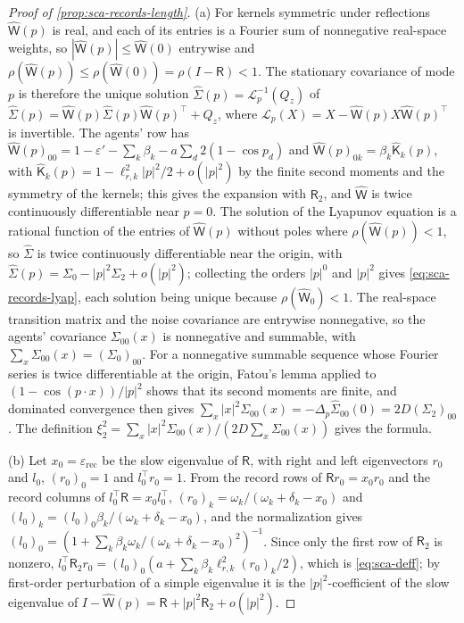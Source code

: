 \begin{proof}[Proof of \cref{prop:sca-records-length}]
(a) For kernels symmetric under reflections $\hat{\mathsf W}(p)$ is real, and each of its entries is a Fourier sum of nonnegative real-space weights, so $|\hat{\mathsf W}(p)|\le\hat{\mathsf W}(0)$ entrywise and $\rho(\hat{\mathsf W}(p))\le\rho(\hat{\mathsf W}(0))=\rho(I-\mathsf R)<1$. The stationary covariance of mode $p$ is therefore the unique solution $\hat\Sigma(p)=\mathcal L_p^{-1}(Q_z)$ of $\hat\Sigma(p)=\hat{\mathsf W}(p)\hat\Sigma(p)\hat{\mathsf W}(p)^\top+Q_z$, where $\mathcal L_p(X)=X-\hat{\mathsf W}(p)X\hat{\mathsf W}(p)^\top$ is invertible. The agents' row has $\hat{\mathsf W}(p)_{00}=1-\varepsilon'-\sum_k\beta_k-a\sum_d2(1-\cos p_d)$ and $\hat{\mathsf W}(p)_{0k}=\beta_k\hat{\mathsf K}_k(p)$, with $\hat{\mathsf K}_k(p)=1-\ell_{r,k}^2|p|^2/2+o(|p|^2)$ by the finite second moments and the symmetry of the kernels; this gives the expansion with $\mathsf R_2$, and $\hat{\mathsf W}$ is twice continuously differentiable near $p=0$. The solution of the Lyapunov equation is a rational function of the entries of $\hat{\mathsf W}(p)$ without poles where $\rho(\hat{\mathsf W}(p))<1$, so $\hat\Sigma$ is twice continuously differentiable near the origin, with $\hat\Sigma(p)=\Sigma_0-|p|^2\Sigma_2+o(|p|^2)$; collecting the orders $|p|^0$ and $|p|^2$ gives \eqref{eq:sca-records-lyap}, each solution being unique because $\rho(\hat{\mathsf W}_0)<1$. The real-space transition matrix and the noise covariance are entrywise nonnegative, so the agents' covariance $\Sigma_{00}(x)$ is nonnegative and summable, with $\sum_x\Sigma_{00}(x)=(\Sigma_0)_{00}$. For a nonnegative summable sequence whose Fourier series is twice differentiable at the origin, Fatou's lemma applied to $(1-\cos(p\cdot x))/|p|^2$ shows that its second moments are finite, and dominated convergence then gives $\sum_x|x|^2\Sigma_{00}(x)=-\Delta_p\hat\Sigma_{00}(0)=2D(\Sigma_2)_{00}$. The definition $\xi_2^2=\sum_x|x|^2\Sigma_{00}(x)/(2D\sum_x\Sigma_{00}(x))$ gives the formula.

(b) Let $x_0=\varepsilon_{\mathrm{rec}}$ be the slow eigenvalue of $\mathsf R$, with right and left eigenvectors $r_0$ and $l_0$, $(r_0)_0=1$ and $l_0^\top r_0=1$. From the record rows of $\mathsf Rr_0=x_0r_0$ and the record columns of $l_0^\top\mathsf R=x_0l_0^\top$, $(r_0)_k=\omega_k/(\omega_k+\delta_k-x_0)$ and $(l_0)_k=(l_0)_0\beta_k/(\omega_k+\delta_k-x_0)$, and the normalization gives $(l_0)_0=(1+\sum_k\beta_k\omega_k/(\omega_k+\delta_k-x_0)^2)^{-1}$. Since only the first row of $\mathsf R_2$ is nonzero, $l_0^\top\mathsf R_2r_0=(l_0)_0(a+\sum_k\beta_k\ell_{r,k}^2(r_0)_k/2)$, which is \eqref{eq:sca-deff}; by first-order perturbation of a simple eigenvalue it is the $|p|^2$-coefficient of the slow eigenvalue of $I-\hat{\mathsf W}(p)=\mathsf R+|p|^2\mathsf R_2+o(|p|^2)$.


\end{proof}
